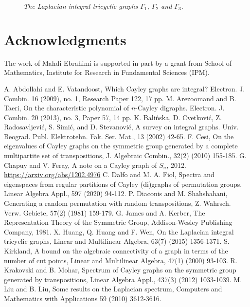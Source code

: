 \documentclass[12pt,a4paper]{article}
\begin{document}
\begin{figure}\label{tricyclic}
\caption{\textit{The Laplacian integral tricyclic graphs $\Gamma_1$, $\Gamma_2$ and $\Gamma_3$.} }
\end{figure}


\section*{Acknowledgments}
The work of Mahdi Ebrahimi is supported in part
by a grant  from School of Mathematics, Institute for Research in Fundamental Sciences (IPM).


\begin{thebibliography}{Dillo 150}
 A. Abdollahi and E. Vatandoost, Which Cayley graphs are integral? Electron. J.
Combin.  16 (2009), no. 1, Research Paper 122, 17 pp.
 M. Arezoomand and B. Taeri, On the characteristic polynomial of $n$-Cayley digraphs.
Electron. J. Combin. 20 (2013), no. 3, Paper 57, 14 pp.
 K. Bali\'{n}ska, D. Cvetkovi\'{c}, Z. Radosavljevi\'{c}, S. Simi\'{c}, and D. Stevanovi\'{c}, A survey
on integral graphs. Univ. Beograd. Publ. Elektrotehn. Fak. Ser. Mat., 13 (2002) 42-65.
 F. Cesi, On the eigenvalues of Cayley graphs on the
symmetric group generated by a complete multipartite set of transpositions, J. Algebraic Combin., 32(2) (2010) 155-185.
 G. Chapuy and V. Feray, A note on a Cayley graph of $S_n$, 2012. \href{https://arxiv.org/abs/1202.4976}{https://arxiv.org/abs/1202.4976}
 C. Dalfo and M. A. Fiol, Spectra and eigenspaces from regular partitions of Cayley (di)graphs of permutation groups, Linear Algebra Appl., 597 (2020) 94-112.
 P. Diaconis and M. Shahshahani, Generating a random permutation with random transpositions, Z. Wahrsch. Verw. Gebiete, 57(2) (1981) 159-179.
  G. James and A. Kerber, The Representation Theory of the Symmetric Group, Addison-Wesley Publishing Company, 1981.
X. Huang, Q. Huang and F. Wen, On the Laplacian integral tricyclic graphs, Linear and Multilinear Algebra, 63(7) (2015) 1356-1371.
 S. Kirkland, A bound on the algebraic connectivity of a graph in terms of the number of cut points, Linear and Multilinear Algebra, 47(1) (2000) 93-103.
 R. Krakovski and B. Mohar, Spectrum of Cayley graphs on the symmetric group
generated by transpositions, Linear Algebra Appl., 437(3) (2012) 1033-1039.
 M. Liu and B. Liu, Some results on the Laplacian spectrum, Computers and Mathematics with Applications 59 (2010) 3612-3616.

\end{thebibliography}
\end{document}
